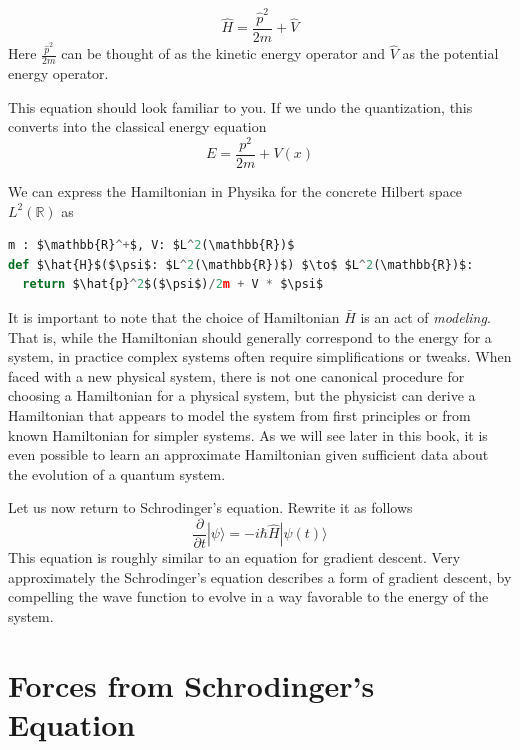 \documentclass[book.tex]{subfiles}
\begin{document}
\begin{equation}
    \hat{H} = \frac{\hat{p}^2}{2m} + \hat{V} 
\end{equation}
Here $\frac{\hat{p}^2}{2m}$ can be thought of as the kinetic energy operator and $\hat{V}$ as the potential energy operator.

This equation should look familiar to you. If we undo the quantization, this converts into the classical energy equation
\begin{equation}
E = \frac{p^2}{2m} + V(x)
\end{equation}

We can express the Hamiltonian in Physika for the concrete Hilbert space $L^2(\mathbb{R})$ as 
\begin{lstlisting}[language=python]
m : $\mathbb{R}^+$, V: $L^2(\mathbb{R})$
def $\hat{H}$($\psi$: $L^2(\mathbb{R})$) $\to$ $L^2(\mathbb{R})$:
  return $\hat{p}^2$($\psi$)/2m + V * $\psi$
\end{lstlisting}

It is important to note that the choice of Hamiltonian $\bar{H}$ is an act of \textit{modeling}. That is, while the Hamiltonian should generally correspond to the energy for a system, in practice complex systems often require simplifications or tweaks. When faced with a new physical system, there is not one canonical procedure for choosing a Hamiltonian for a physical system, but the physicist can derive a Hamiltonian that appears to model the system from first principles or from known Hamiltonian for simpler systems. As we will see later in this book, it is even possible to learn an approximate Hamiltonian given sufficient data about the evolution of a quantum system.

Let us now return to Schrodinger's equation. Rewrite it as follows
\begin{equation}
    \frac{\partial}{\partial t} | \psi \rangle = -i \hbar \hat{H} | \psi(t) \rangle 
\end{equation}
This equation is roughly similar to an equation for gradient descent. Very approximately the Schrodinger's equation describes a form of gradient descent, by compelling the wave function to evolve in a way favorable to the energy of the system.

\section{Forces from Schrodinger's Equation}
\end{document}
